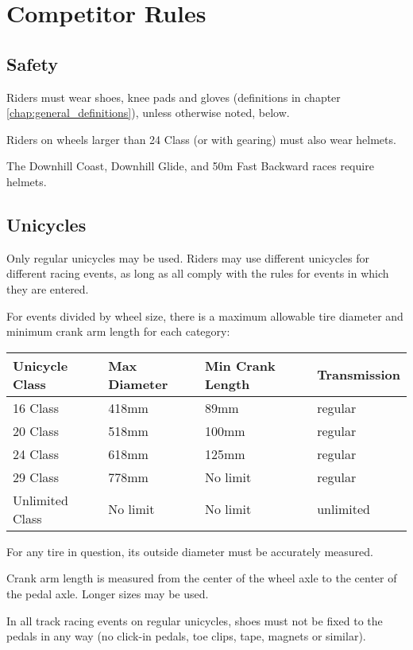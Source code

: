 \chapter{Competitor Rules}

\section{Safety}

Riders must wear shoes, knee pads and gloves (definitions in chapter \ref{chap:general_definitions}), unless otherwise noted, below.

Riders on wheels larger than 24 Class (or with gearing) must also wear helmets.

The Downhill Coast, Downhill Glide, and 50m Fast Backward races require helmets.

\section{Unicycles}

Only regular unicycles may be used.
Riders may use different unicycles for different racing events, as long as all comply with the rules for events in which they are entered.

For events divided by wheel size, there is a maximum allowable tire diameter and minimum crank arm length for each category:

\begin{longtable}{|p{3cm}|p{3cm}|p{4cm}|p{3cm}|}
\hline
\textbf{Unicycle Class} & \textbf{Max Diameter} & \textbf{Min Crank Length} & \textbf{Transmission}\\
\hline
16 Class & 418mm & 89mm & regular \\
\hline
20 Class & 518mm & 100mm & regular \\
\hline
24 Class & 618mm & 125mm & regular \\
\hline
29 Class & 778mm & No limit & regular \\
\hline
Unlimited Class & No limit & No limit & unlimited \\
\hline
\end{longtable}

For any tire in question, its outside diameter must be accurately measured.

Crank arm length is measured from the center of the wheel axle to the center of the pedal axle.
Longer sizes may be used.

In all track racing events on regular unicycles, shoes must not be fixed to the pedals in any way (no click-in pedals, toe clips, tape, magnets or similar).

